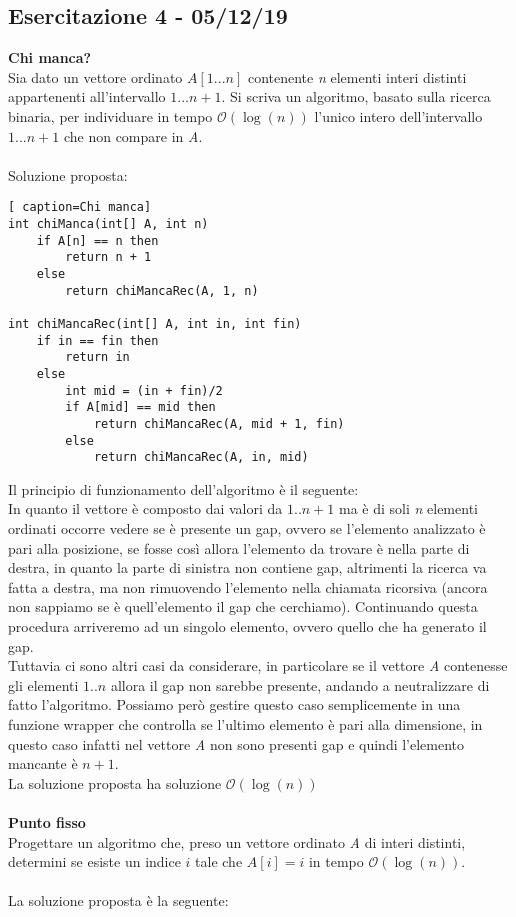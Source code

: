 \documentclass[../cheatSheetAlgoritmi.tex]{subfiles}
\begin{document}
\subsection{Esercitazione 4 - 05/12/19}
\textbf{Chi manca?} \\
Sia dato un vettore ordinato $A[1...n]$ contenente \textit{n} elementi interi distinti appartenenti all’intervallo $1...n+1$. Si scriva un algoritmo, basato sulla ricerca binaria, per individuare in tempo $\mathcal{O}(\log(n))$ l’unico intero dell’intervallo $1...n+1$ che non compare in \textit{A}.
\\\\
Soluzione proposta:
\begin{lstlisting}[ caption=Chi manca]
int chiManca(int[] A, int n)
	if A[n] == n then
		return n + 1
	else	
		return chiMancaRec(A, 1, n)

int chiMancaRec(int[] A, int in, int fin)
	if in == fin then 
  		return in
  	else
    	int mid = (in + fin)/2
    	if A[mid] == mid then 
      		return chiMancaRec(A, mid + 1, fin)
    	else
      		return chiMancaRec(A, in, mid)
\end{lstlisting}
Il principio di funzionamento dell'algoritmo è il seguente: \\
In quanto il vettore è composto dai valori da $1..n+1$ ma è di soli \textit{n} elementi ordinati occorre vedere se è presente un gap, ovvero se l'elemento analizzato è pari alla posizione, se fosse così allora l'elemento da trovare è nella parte di destra, in quanto la parte di sinistra non contiene gap, altrimenti la ricerca va fatta a destra, ma non rimuovendo l'elemento nella chiamata ricorsiva (ancora non sappiamo se è quell'elemento il gap che cerchiamo). Continuando questa procedura arriveremo ad un singolo elemento, ovvero quello che ha generato il gap.\\
Tuttavia ci sono altri casi da considerare, in particolare se il vettore \textit{A} contenesse gli elementi $1..n$ allora il gap non sarebbe presente, andando a neutralizzare di fatto l'algoritmo. Possiamo però gestire questo caso semplicemente in una funzione wrapper che controlla se l'ultimo elemento è pari alla dimensione, in questo caso infatti nel vettore \textit{A} non sono presenti gap e quindi l'elemento mancante è $n + 1$. \\
La soluzione proposta ha soluzione $\mathcal{O}(\log(n))$
\\\\
\textbf{Punto fisso} \\
Progettare un algoritmo che, preso un vettore ordinato \textit{A} di interi distinti, determini se esiste un indice $i$ tale che $A[i] = i$ in tempo $\mathcal{O}(\log(n))$.\\\\
La soluzione proposta è la seguente:
\newpage
\end{document}
